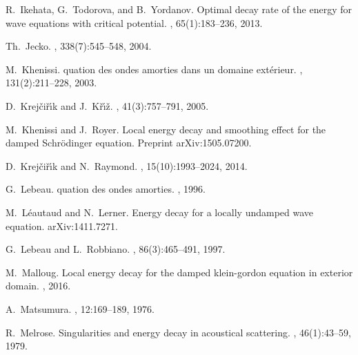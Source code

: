 \documentclass[10pt, a4paper,reqno]{amsart}
\theoremstyle{plain}
\theoremstyle{definition}
\theoremstyle{remark}
\begin{document}
\begin{thebibliography}{{Wak}14}
R.~Ikehata, G.~Todorova, and B.~Yordanov.
\newblock Optimal decay rate of the energy for wave equations with critical
  potential.
, 65(1):183--236, 2013.

{\relax Th}.~Jecko.
, 338(7):545--548, 2004.

M.~Khenissi.
quation des ondes amorties dans un domaine ext\'erieur.
, 131(2):211--228, 2003.

D.~{Krej\v ci\v r\'\i k} and J.~{K\v r\'\i \v z}.
, 41(3):757--791, 2005.

M.~Khenissi and J.~Royer.
\newblock Local energy decay and smoothing effect for the damped
  {S}chr\"odinger equation.
\newblock Preprint arXiv:1505.07200.

D.~{Krej\v{c}i\v{r}\'{\i}k} and N.~{Raymond}.
, 15(10):1993--2024, 2014.

G.~Lebeau.
quation des ondes amorties.
, 1996.

M.~L\'eautaud and N.~Lerner.
\newblock Energy decay for a locally undamped wave equation.
\newblock arXiv:1411.7271.

G.~{Lebeau} and L.~{Robbiano}.
, 86(3):465--491, 1997.

M.~Malloug.
\newblock Local energy decay for the damped klein-gordon equation in exterior
  domain.
, 2016.

A.~{Matsumura}.
, 12:169--189, 1976.

R.~Melrose.
\newblock Singularities and energy decay in acoustical scattering.
, 46(1):43--59, 1979.


\end{thebibliography}
\end{document}
